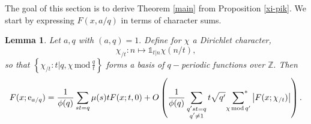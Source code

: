 \documentclass{article}
\newtheorem{lemma}[prop]{Lemma}
\newcommand{\Mod}{\,\mathrm{mod}\,}
\newcommand{\e}{\mathrm{e}}
\newcommand{\Z}{\mathds{Z}}
\newcommand{\Ind}{\mathbb{1}}
\newcommand{\starsum}{\ \sideset{}{^*}\sum}
\begin{document}
The goal of this section is to derive Theorem \ref{main} from Proposition \ref{xi-pik}. We start by expressing $F(x, a/q)$ in terms of character sums. 

\begin{lemma}\label{decomp}
    Let $a,q$ with $(a, q) = 1.$ Define for $\chi$ a Dirichlet character, $$\chi_{/t} : n \mapsto \Ind_{t|n}\chi(n/t),$$ so that $\left\{\chi_{/t} : t|q, \chi\Mod \frac{q}{t}\right\}$ forms a basis of $q-$periodic functions over $\Z.$ Then
    \begin{equation}\label{decomp-eq}
        F(x; \e_{a/q}) = \frac{1}{\phi(q)}\sum_{st = q} \mu(s) t F(x; t, 0) + O\left(\frac{1}{\phi(q)}\sum_{\substack{q'st = q \\ q'\ne 1}} t\sqrt{q'}\starsum_{\chi\Mod q'} \left|F(x; \chi_{/t})\right| \right).
    \end{equation}
\end{lemma}
\end{document}
